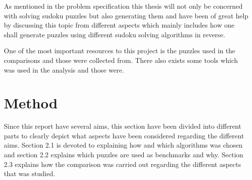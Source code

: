 \documentclass[a4paper,11pt]{kth-mag}
\begin{document}
As mentioned in the problem specification this thesis will not only be concerned with solving sudoku puzzles but also generating them and \cite{generation} have been of great help by discussing this topic from different aspects which mainly includes how one shall generate puzzles using different sudoku solving algorithms in reverse.

One of the most important resources to this project is the puzzles used in the comparisons and those were collected from. \cite{database} There also exists some tools which was used in the analysis and those were. \cite{13,14,15,16}



\chapter{Method}
Since this report have several aims, this section have been divided into different parts to clearly depict what aspects have been considered regarding the different aims. Section 2.1 is devoted to explaining how and which algorithms was chosen and section 2.2 explains which puzzles are used as benchmarks and why. Section 2.3 explains how the comparison was carried out regarding the different aspects that was studied.
\end{document}
